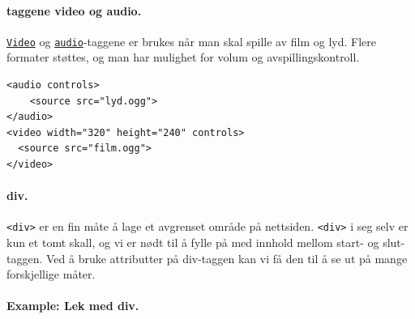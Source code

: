 \documentclass[%
oneside,                 %
final,                   %
12pt]{article}
\newenvironment{notice_mdfboxadmon}[1][]{
\begin{notice_mdfboxmdframed}[frametitle=#1]
}
{
\end{notice_mdfboxmdframed}
}
\begin{document}
 

\paragraph{taggene video og audio.}


\href{{http://www.w3schools.com/tags/tag_video.asp}}{\nolinkurl{Video}} og
\href{{http://www.w3schools.com/tags/tag_audio.asp}}{\nolinkurl{audio}}-taggene er
brukes når man skal spille av film og lyd. Flere formater støttes, og
man har mulighet for volum og avspillingskontroll.


\begin{notice_mdfboxadmon}
\begin{verbatim}
<audio controls>
    <source src="lyd.ogg">
</audio>
<video width="320" height="240" controls>
  <source src="film.ogg">
</video>
\end{verbatim}
\end{notice_mdfboxadmon}

 

\paragraph{div.}

\texttt{<div>} er en fin måte å lage et avgrenset område på
nettsiden. \texttt{<div>} i seg selv er kun et tomt skall, og vi er nødt til
å fylle på med innhold mellom start- og slut-taggen. Ved å bruke
attributter på div-taggen kan vi få den til å se ut på mange
forskjellige måter.

\paragraph{Example: Lek med div.}
\label{example:Lekmeddiv}
\end{document}
